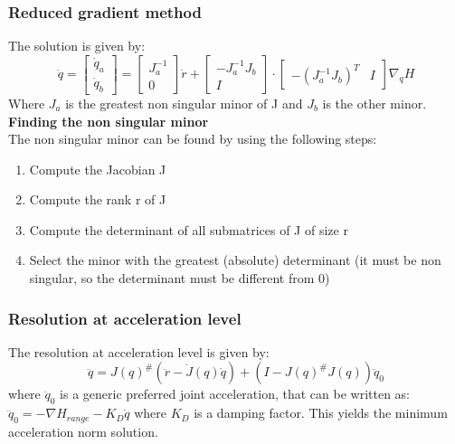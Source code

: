 \documentclass[a4paper,12pt]{article}
\begin{document}
    \subsubsection{Reduced gradient method}\label{sec:Reduced gradient method}
     The solution is
     given by: \begin{equation}
        \dot{q} = \begin{bmatrix}
            \dot{q}_a \\
            \dot{q}_b
        \end{bmatrix} = \begin{bmatrix}
            J_a^{-1} \\
            0 
        \end{bmatrix}\dot{r}
        + \begin{bmatrix}
            -J_a^{-1} J_b \\ 
            I
        \end{bmatrix} \cdot \begin{bmatrix} 
            -(J_a^{-1}J_b)^T & I
        \end{bmatrix} \nabla _q H
    \end{equation}
    Where $J_a$ is the greatest non singular minor of J and $J_b$ is 
    the other minor. \\
    \textbf{Finding the non singular minor} \\
    The non singular minor can be found by using the following steps:
    \begin{enumerate}
        \item Compute the Jacobian J 
        \item Compute the rank r of J
        \item Compute the determinant of all submatrices of J of size r
        \item Select the minor with the greatest (absolute) determinant (it must be 
        non singular, so the determinant must be different from 0)
    \end{enumerate}
    \subsubsection{Resolution at acceleration level}\label{sec:Resolution at acceleration level}
    The resolution at acceleration level is given by:
    \begin{equation}
        \ddot{q} = J(q)^{\#}(\ddot{r}-\dot{J}(q)\dot{q}) + (I - J(q)^{\#}J(q))\ddot{q}_0
    \end{equation}
    where $\ddot{q}_0$ is a generic preferred joint acceleration, that can be 
    written as: $\ddot{q}_0 = - \nabla H_{range} - K_D \dot{q}$ where $K_D$ is a damping factor.
    This yields the minimum acceleration norm solution.
\end{document}
